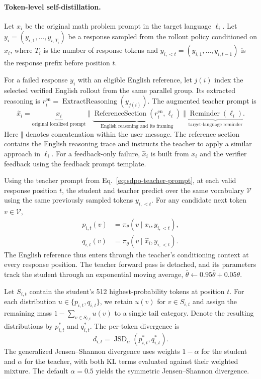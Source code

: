 \documentclass[11pt]{article}
\begin{document}
\paragraph{Token-level self-distillation.}
Let \(x_i\) be the original math problem prompt in the target language
\(\ell_i\). Let \(y_i=(y_{i,1},\ldots,y_{i,T_i})\) be a response sampled
from the rollout policy conditioned on \(x_i\), where \(T_i\) is the number
of response tokens and \(y_{i,<t}=(y_{i,1},\ldots,y_{i,t-1})\) is the
response prefix before position \(t\).

For a failed response \(y_i\) with an eligible English reference, let
\(j(i)\) index the selected verified English rollout from the same
parallel group. Its extracted
reasoning is \(r_i^{\mathrm{en}} =
\operatorname{ExtractReasoning}(y_{j(i)})\). The augmented teacher prompt is
\begin{equation}
\hat{x}_i =
\underbrace{x_i}_{\text{original localized prompt}}
\;\Vert\;
\underbrace{\operatorname{ReferenceSection}
  (r_i^{\mathrm{en}},\ell_i)}_{\text{English reasoning and its framing}}
\;\Vert\;
\underbrace{\operatorname{Reminder}(\ell_i)}_{\text{target-language reminder}}.
\label{eq:sdpo-teacher-prompt}
\end{equation}
Here \(\Vert\) denotes concatenation within the user message. The reference
section contains the English reasoning trace and instructs the teacher to
apply a similar approach in \(\ell_i\). For a feedback-only failure,
\(\hat{x}_i\) is built from \(x_i\) and the verifier feedback using the
feedback prompt template.

Using the teacher prompt from Eq.~\eqref{eq:sdpo-teacher-prompt}, at each
valid response position \(t\), the student and teacher predict over
the same vocabulary \(\mathcal V\) using the same previously sampled tokens
\(y_{i,<t}\). For any candidate next token \(v\in\mathcal V\),
\begin{align}
p_{i,t}(v) &= \pi_\theta(v\mid x_i,y_{i,<t}), \\
q_{i,t}(v) &= \pi_{\bar\theta}(v\mid\hat{x}_i,y_{i,<t}).
\label{eq:sdpo-next-token-distributions}
\end{align}
The English reference thus enters through the teacher's conditioning context
at every response position. The teacher forward pass is detached, and its
parameters track the student through an exponential moving average,
\(\bar\theta\leftarrow 0.95\bar\theta + 0.05\theta\).

Let \(S_{i,t}\) contain the student's 512 highest-probability tokens at
position \(t\). For each distribution \(u\in\{p_{i,t},q_{i,t}\}\), we
retain \(u(v)\) for \(v\in S_{i,t}\) and assign the remaining mass
\(1-\sum_{v\in S_{i,t}}u(v)\) to a single tail category. Denote the resulting
distributions by \(p^*_{i,t}\) and \(q^*_{i,t}\). The per-token divergence is
\begin{equation}
d_{i,t}=\operatorname{JSD}_{\alpha}(p^*_{i,t},q^*_{i,t}).
\label{eq:sdpo-token-divergence}
\end{equation}
The generalized Jensen--Shannon divergence uses weights \(1-\alpha\) for
the student and \(\alpha\) for the teacher, with both KL terms evaluated
against their weighted mixture. The default \(\alpha=0.5\)
yields the symmetric Jensen--Shannon divergence.
\end{document}
